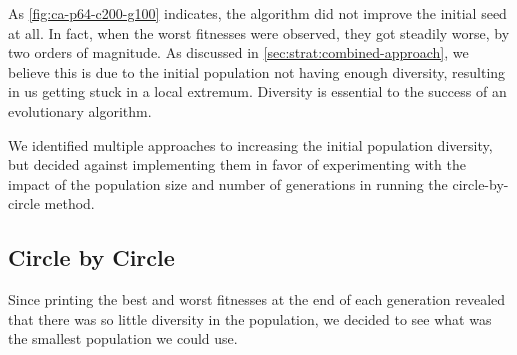 \documentclass{article}
\begin{document}
As \autoref{fig:ca-p64-c200-g100} indicates, the algorithm did not improve the initial seed at all.
In fact, when the worst fitnesses were observed, they got steadily worse, by two orders of
magnitude. As discussed in \autoref{sec:strat:combined-approach}, we believe this is due to the
initial population not having enough diversity, resulting in us getting stuck in a local extremum.
Diversity is essential to the success of an evolutionary algorithm.

We identified multiple approaches to increasing the initial population diversity, but decided
against implementing them in favor of experimenting with the impact of the population size and
number of generations in running the circle-by-circle method.

\subsection{Circle by Circle}\label{sec:results:circle-by-circle}

Since printing the best and worst fitnesses at the end of each generation revealed that there was
so little diversity in the population, we decided to see what was the smallest population we could
use.
\end{document}
